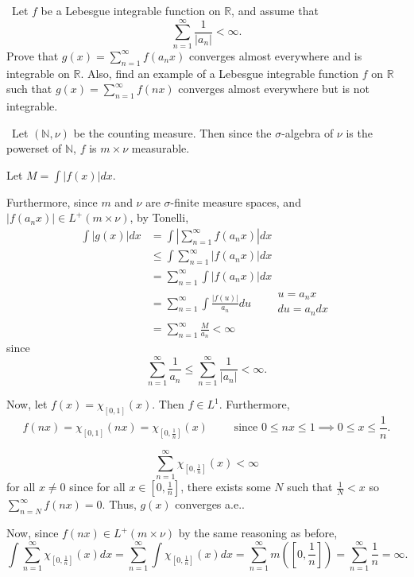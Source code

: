 \documentclass[12pt]{Homework}
\begin{document}
\begin{problem} $\,$
Let $f$ be a Lebesgue integrable function on $\mathbb{R}$, and assume that $$\sum_{n=1}^\infty\frac{1}{|a_n|}<\infty.$$
Prove that $g(x)=\sum_{n=1}^\infty f(a_nx)$ converges almost everywhere and is integrable on $\mathbb{R}$. Also, find an example of a Lebesgue integrable function $f$ on $\mathbb{R}$ such that $g(x)=\sum_{n=1}^\infty f(nx)$ converges almost everywhere but is not integrable. 
\end{problem}


\begin{solution}$\,$
Let $(\mathbb{N},\nu)$ be the counting measure. Then since the $\sigma$-algebra of $\nu$ is the powerset of $\mathbb{N}$, $f$ is $m\times\nu$ measurable. 

Let $M=\int|f(x)|dx.$

Furthermore, since $m$ and $\nu$ are $\sigma$-finite measure spaces, and $|f(a_nx)|\in L^+(m\times\nu)$, by Tonelli, \begin{align*}
    \int|g(x)|dx&=\int\left|\sum_{n=1}^\infty f(a_nx)\right|dx\\
    &\le\int\sum_{n=1}^\infty|f(a_nx)|dx\\
    &=\sum_{n=1}^\infty\int|f(a_nx)|dx\\
    &=\sum_{n=1}^\infty\int\frac{|f(u)|}{a_n}du\qquad \begin{matrix}
    u=a_nx   \\
    du=a_ndx
\end{matrix}\\
&=\sum_{n=1}^\infty\frac{M}{a_n}<\infty
\end{align*}since $$\sum_{n=1}^\infty \frac{1}{a_n}\le\sum_{n=1}^\infty \frac{1}{|a_n|}<\infty.$$

Now, let $f(x)=\chi_{[0,1]}(x)$. Then $f\in L^1$. Furthermore, $$f(nx)=\chi_{[0,1]}(nx)=\chi_{[0,\frac{1}{n}]}(x)\qquad\text{ since }0\le nx\le 1\implies 0\le x\le\frac{1}{n}.$$

$$\sum_{n=1}^\infty\chi_{[0,\frac{1}{n}]}(x)<\infty$$ for all $x\not=0$ since for all $x\in[0,\frac{1}{n}]$, there exists some $N$ such that $\frac{1}{N}<x$ so $\sum_{n=N}^\infty f(nx)=0$. Thus, $g(x)$ converges a.e.. 

Now, since $f(nx)\in L^+(m\times\nu)$ by the same reasoning as before, $$\int\sum_{n=1}^\infty \chi_{[0,\frac{1}{n}]}(x)dx=\sum_{n=1}^\infty\int\chi_{[0,\frac{1}{n}]}(x)dx=\sum_{n=1}^\infty m([0,\frac{1}{n}])=\sum_{n=1}^\infty\frac{1}{n}=\infty.$$
\end{solution}
\newpage
\end{document}
